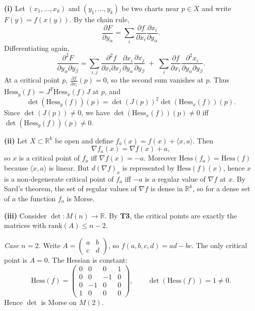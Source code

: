 \begin{solution}
\noindent\textbf{(i)}
	Let $(x_1,\dots,x_k)$ and $(y_1,\dots,y_k)$ be two charts near $p\in X$ and write $F(y)=f(x(y))$.
	By the chain rule,
	\[
	\frac{\partial F}{\partial y_\alpha}
	=\sum_i \frac{\partial f}{\partial x_i}\frac{\partial x_i}{\partial y_\alpha}.
	\]
	Differentiating again,
	\[
	\frac{\partial^2 F}{\partial y_\alpha\partial y_\beta}
	=\sum_{i,j}\frac{\partial^2 f}{\partial x_i\partial x_j}
	\frac{\partial x_i}{\partial y_\alpha}\frac{\partial x_j}{\partial y_\beta}
	\;+\;\sum_i \frac{\partial f}{\partial x_i}\frac{\partial^2 x_i}{\partial y_\alpha\partial y_\beta}.
	\]
	At a critical point $p$, $\frac{\partial f}{\partial x_i}(p)=0$, so the second sum vanishes at $p$.
	Thus $\mathrm{Hess}_y(f)=J^T\mathrm{Hess}_x(f)J$ at $p$, and
	\[
	\det(\mathrm{Hess}_y(f))(p)=\det(J(p))^2\det(\mathrm{Hess}_x(f))(p).
	\]
	Since $\det(J(p))\neq 0$, we have $\det(\mathrm{Hess}_x(f))(p)\neq 0$ iff $\det(\mathrm{Hess}_y(f))(p)\neq 0$.
	
	\medskip
	\noindent\textbf{(ii)}
	Let $X\subset\mathbb{R}^k$ be open and define $f_a(x)=f(x)+\langle x,a\rangle$.
	Then
	\[
	\nabla f_a(x)=\nabla f(x)+a,
	\]
	so $x$ is a critical point of $f_a$ iff $\nabla f(x)=-a$.
	Moreover $\mathrm{Hess}(f_a)=\mathrm{Hess}(f)$ because $\langle x,a\rangle$ is linear.
	But $d(\nabla f)_x$ is represented by $\mathrm{Hess}(f)(x)$, hence $x$ is a non-degenerate critical point of $f_a$
	iff $-a$ is a regular value of $\nabla f$ at $x$.
	By Sard's theorem, the set of regular values of $\nabla f$ is dense in $\mathbb{R}^k$,
	so for a dense set of $a$ the function $f_a$ is Morse.
	
	\medskip
	\noindent\textbf{(iii)}
	Consider $\det:M(n)\to\mathbb{R}$. By \textbf{T3}, the critical points are exactly the matrices with
	$\mathrm{rank}(A)\le n-2$.
	
	\smallskip
	\noindent\emph{Case $n=2$.}
	Write $A=\begin{pmatrix}a&b\\c&d\end{pmatrix}$, so $f(a,b,c,d)=ad-bc$.
	The only critical point is $A=0$. The Hessian is constant:
	\[
	\mathrm{Hess}(f)=
	\begin{pmatrix}
		0&0&0&1\\
		0&0&-1&0\\
		0&-1&0&0\\
		1&0&0&0
	\end{pmatrix},
	\qquad
	\det(\mathrm{Hess}(f))=1\neq 0.
	\]
	Hence $\det$ is Morse on $M(2)$.
	

\end{solution}
